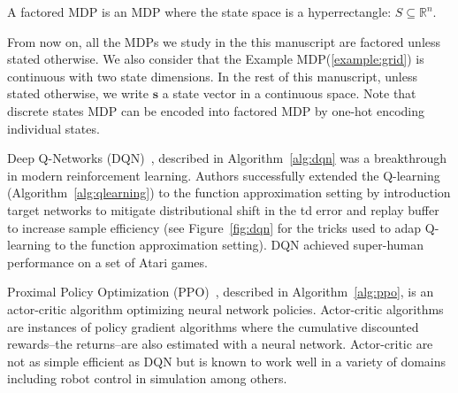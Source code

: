 \begin{definition} A factored MDP is an MDP\cite{def:mdp} where the state space is a hyperrectangle: $S\subseteq \mathbb{R}^n$.
\end{definition}

From now on, all the MDPs we study in the this manuscript are factored unless stated otherwise. 
We also consider that the Example MDP(\ref{example:grid}) is continuous with two state dimensions.
In the rest of this manuscript, unless stated otherwise, we write $\boldsymbol{s}$ a state vector in a continuous space.
Note that discrete states MDP can be encoded into factored MDP by one-hot encoding individual states.

Deep Q-Networks (DQN)~\cite{dqn}, described in Algorithm~\ref{alg:dqn} was a breakthrough in modern reinforcement learning.
Authors successfully extended the Q-learning (Algorithm~\ref{alg:qlearning}) to the function approximation setting by introduction target networks to mitigate distributional shift in the td error and replay buffer to increase sample efficiency (see Figure~\ref{fig:dqn} for the tricks used to adap Q-learning to the function approximation setting).
DQN achieved super-human performance on a set of Atari games.

Proximal Policy Optimization (PPO)~\cite{ppo}, described in Algorithm~\ref{alg:ppo}, is an actor-critic algorithm\cite{pg_sutton} optimizing neural network policies. 
Actor-critic algorithms are instances of policy gradient algorithms where the cumulative discounted rewards--the returns--are also estimated with a neural network. 
Actor-critic are not as simple efficient as DQN but is known to work well in a variety of domains including robot control in simulation among others.

